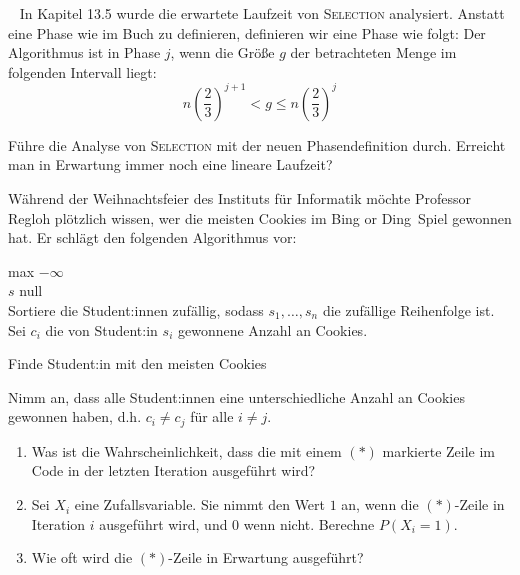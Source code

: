 \documentclass{uebung_cs}
\begin{document}
\begin{aufgabe}\
	In Kapitel 13.5 wurde die erwartete Laufzeit von \textsc{Selection} analysiert.
	Anstatt eine Phase wie im Buch zu definieren, definieren wir eine Phase wie folgt:
	Der Algorithmus ist in Phase $j$, wenn die Größe $g$ der betrachteten Menge im folgenden Intervall liegt:
	\[n\left(\frac{2}{3}\right)^{j+1} < g \leq n\left(\frac{2}{3}\right)^j \]
	
	Führe die Analyse von \textsc{Selection} mit der neuen Phasendefinition durch. Erreicht man in Erwartung immer noch eine lineare Laufzeit?
\end{aufgabe}    

\begin{aufgabe}[Weihnachtsfeier im Institut]
	Während der Weihnachtsfeier des Instituts für Informatik möchte Professor Regloh plötzlich wissen, wer die meisten Cookies im \glqq Bing or Ding\grqq{}~Spiel gewonnen hat. Er schlägt den folgenden Algorithmus vor:
	
	\begin{algorithm}[H]
		\SetAlgoLined
		max \gets $- \infty$\\
		$s$ \gets null\\
		Sortiere die Student:innen zufällig, sodass $s_1,\dots,s_n$ die zufällige Reihenfolge ist.\\
		Sei $c_i$ die von Student:in $s_i$ gewonnene Anzahl an Cookies.\\
		\caption{Finde Student:in mit den meisten Cookies}
\end{algorithm}
	
	Nimm an, dass alle Student:innen eine unterschiedliche Anzahl an Cookies gewonnen haben, d.h. $c_i \neq c_j$ für alle $i \neq j$.
	\begin{enumerate}
		\item Was ist die Wahrscheinlichkeit, dass die mit einem $(\ast)$ markierte Zeile im Code in der letzten Iteration ausgeführt wird?\\
		\item Sei $X_i$ eine Zufallsvariable. Sie nimmt den Wert $1$ an, wenn die $(\ast)$-Zeile in Iteration $i$ ausgeführt wird, und $0$ wenn nicht. Berechne $P(X_i = 1)$.\\%
		\item Wie oft wird die $(\ast)$-Zeile in Erwartung ausgeführt?
	\end{enumerate}
\end{aufgabe}
\end{document}
